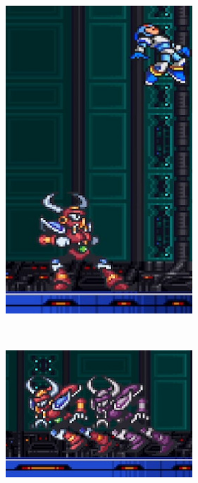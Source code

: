\begin{figure}[htp]
\begin{figure}[htp]
\begin{subfigure}{0.3\linewidth}
		\includegraphics[width=\linewidth]{figures/X1/Boomer_lift_2.jpg}
		\caption{}
	\end{subfigure}\\
	\begin{subfigure}{0.4\linewidth}
		\centering
		\includegraphics[width=\linewidth]{figures/X1/Boomer_dash.jpg}

\end{subfigure}
\end{figure}
\end{figure}

